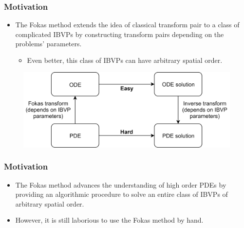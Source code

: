 \documentclass{beamer}
\begin{document}
\begin{frame}
    \frametitle{Motivation}
    \begin{itemize}
        \item The Fokas method extends the idea of classical transform pair to a class of complicated IBVPs by constructing transform pairs depending on the problems' parameters.
        \begin{itemize}
            \item Even better, this class of IBVPs can have arbitrary spatial order.
        \end{itemize}
    \end{itemize}
    \begin{figure}[htpb!]
        \centering
        \includegraphics[width=1\textwidth]{fokas_transform.png}
        \label{fig:fokas_transform}
    \end{figure}
\end{frame}

\begin{frame}[t]
    \frametitle{Motivation}
    \begin{itemize}
        \item The Fokas method advances the understanding of high order PDEs by providing an algorithmic procedure to solve an entire class of IBVPs of arbitrary spatial order.
        \item However, it is still laborious to use the Fokas method by hand.
    \end{itemize}
\end{frame}
\end{document}
